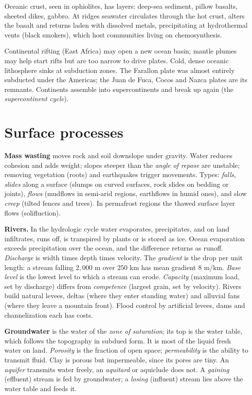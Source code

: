 Oceanic crust, seen in ophiolites, has
layers: deep-sea sediment, pillow basalts,
sheeted dikes, gabbro. At ridges seawater
circulates through the hot crust, alters
the basalt and returns laden with dissolved
metals, precipitating at hydrothermal vents
(black smokers), which host communities
living on chemosynthesis.

Continental rifting (East Africa) may open
a new ocean basin; mantle plumes may help
start rifts but are too narrow to drive
plates. Cold, dense oceanic lithosphere
sinks at subduction zones. The Farallon
plate was almost entirely subducted under
the Americas; the Juan de Fuca, Cocos and
Nazca plates are its remnants. Continents
assemble into supercontinents and break up
again (the \emph{supercontinent cycle}).

\section{Surface processes}
\label{section-surface-processes}

\textbf{Mass wasting} moves rock and soil
downslope under gravity. Water reduces
cohesion and adds weight; slopes steeper
than the \emph{angle of repose} are
unstable; removing vegetation (roots) and
earthquakes trigger movements. Types:
\emph{falls}, \emph{slides} along a
surface (slumps on curved surfaces, rock
slides on bedding or joints), \emph{flows}
(mudflows in semi-arid regions, earthflows
in humid ones), and slow \emph{creep}
(tilted fences and trees). In permafrost
regions the thawed surface layer flows
(solifluction).

\textbf{Rivers.} In the hydrologic cycle
water evaporates, precipitates, and on land
infiltrates, runs off, is transpired by
plants or is stored as ice. Ocean
evaporation exceeds precipitation over the
ocean, and the difference returns as
runoff. \emph{Discharge} is width times
depth times velocity. The \emph{gradient}
is the drop per unit length: a stream
falling $2{,}000$ m over $250$ km has mean
gradient $8$ m/km. \emph{Base level} is the
lowest level to which a stream can erode.
\emph{Capacity} (maximum load, set by
discharge) differs from \emph{competence}
(largest grain, set by velocity). Rivers
build natural levees, deltas (where they
enter standing water) and alluvial fans
(where they leave a mountain front). Flood
control by artificial levees, dams and
channelization each has costs.

\textbf{Groundwater} is the water of the
\emph{zone of saturation}; its top is the
water table, which follows the topography
in subdued form. It is most of the liquid
fresh water on land. \emph{Porosity} is the
fraction of open space; \emph{permeability}
is the ability to transmit fluid. Clay is
porous but impermeable, since its pores are
tiny. An \emph{aquifer} transmits water
freely, an \emph{aquitard} or aquiclude
does not. A \emph{gaining} (effluent)
stream is fed by groundwater; a
\emph{losing} (influent) stream lies above
the water table and feeds it.

